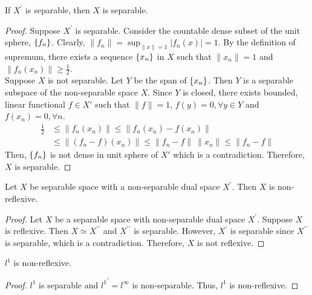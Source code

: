 \begin{theorem}
	If $X^\prime$ is separable, then $X$ is separable.
\end{theorem}
\begin{proof}
	Suppose $X^\prime$ is separable.
	Consider the countable dense subset of the unit sphere, $\left\{f_n\right\}$.
	Clearly, $\displaystyle \|f_n\| = \sup_{\|x\|=1}|f_n(x)| = 1$.
	By the definition of supremum, there exists a sequence $\left\{x_n\right\}$ in $X$ such that $\|x_n\| = 1$ and $\|f_n(x_n)\| \ge \frac{1}{2}$.\\

	Suppose $X$ is not separable.
	Let $Y$ be the span of $\left\{x_n\right\}$.
	Then $Y$ is a separable subspace of the non-separable space $X$.
	Since $Y$ is closed, there exists bounded, linear functional $f \in X'$ such that $\|f\| = 1$, $f(y) = 0,\forall y \in Y$ and $f(x_n) = 0,\forall n$.
	\begin{align*}
	\frac{1}{2}
		& \le \|f_n(x_n)\| 
		 \le \|f_n(x_n) - f(x_n)\| \\
		& \le \|(f_n-f)(x_n)\| 
		 \le \|f_n-f\|\ \|x_n\| 
		 \le \|f_n-f\|
	\end{align*}
	Then, $\left\{f_n\right\}$ is not dense in unit sphere of $X'$ which is a contradiction.
	Therefore, $X$ is separable.
\end{proof}

\begin{remark}
	Let $X$ be separable space with a non-separable dual space $X^\prime$.
	Then $X$ is non-reflexive.
\end{remark}
\begin{proof}
	Let $X$ be a separable space with non-separable dual space $X^\prime$.
	Suppose $X$ is reflexive.
	Then $X \simeq X^{\prime\prime}$ and $X^{\prime\prime}$ is separable.
	However, $X^\prime$ is separable since $X^{\prime\prime}$ is separable, which is a contradiction.
	Therefore, $X$ is not reflexive.
\end{proof}
\begin{important}
	$l^1$ is non-reflexive.
\end{important}
\begin{proof}
	$l^1$ is separable and ${l^1}^\prime = l^\infty$ is non-separable.
	Thus, $l^1$ is non-reflexive.
\end{proof}

